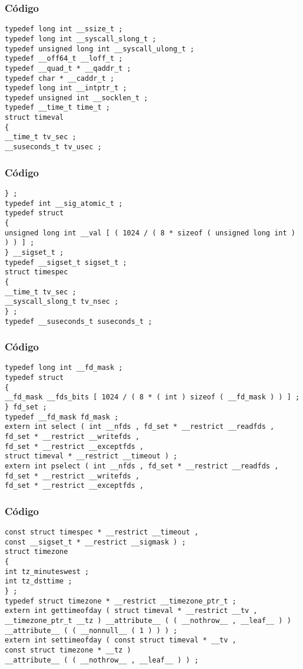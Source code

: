 \documentclass{beamer}
\begin{document}
\begin{frame}[fragile]
\frametitle{C\'odigo}
\begin{verbatim}
typedef long int __ssize_t ; 
typedef long int __syscall_slong_t ; 
typedef unsigned long int __syscall_ulong_t ; 
typedef __off64_t __loff_t ; 
typedef __quad_t * __qaddr_t ; 
typedef char * __caddr_t ; 
typedef long int __intptr_t ; 
typedef unsigned int __socklen_t ; 
typedef __time_t time_t ; 
struct timeval 
{ 
__time_t tv_sec ; 
__suseconds_t tv_usec ; 
\end{verbatim}
\end{frame}
\begin{frame}[fragile]
\frametitle{C\'odigo}
\begin{verbatim}
} ; 
typedef int __sig_atomic_t ; 
typedef struct 
{ 
unsigned long int __val [ ( 1024 / ( 8 * sizeof ( unsigned long int ) ) ) ] ; 
} __sigset_t ; 
typedef __sigset_t sigset_t ; 
struct timespec 
{ 
__time_t tv_sec ; 
__syscall_slong_t tv_nsec ; 
} ; 
typedef __suseconds_t suseconds_t ; 
\end{verbatim}
\end{frame}
\begin{frame}[fragile]
\frametitle{C\'odigo}
\begin{verbatim}
typedef long int __fd_mask ; 
typedef struct 
{ 
__fd_mask __fds_bits [ 1024 / ( 8 * ( int ) sizeof ( __fd_mask ) ) ] ; 
} fd_set ; 
typedef __fd_mask fd_mask ; 
extern int select ( int __nfds , fd_set * __restrict __readfds , 
fd_set * __restrict __writefds , 
fd_set * __restrict __exceptfds , 
struct timeval * __restrict __timeout ) ; 
extern int pselect ( int __nfds , fd_set * __restrict __readfds , 
fd_set * __restrict __writefds , 
fd_set * __restrict __exceptfds , 
\end{verbatim}
\end{frame}
\begin{frame}[fragile]
\frametitle{C\'odigo}
\begin{verbatim}
const struct timespec * __restrict __timeout , 
const __sigset_t * __restrict __sigmask ) ; 
struct timezone 
{ 
int tz_minuteswest ; 
int tz_dsttime ; 
} ; 
typedef struct timezone * __restrict __timezone_ptr_t ; 
extern int gettimeofday ( struct timeval * __restrict __tv , 
__timezone_ptr_t __tz ) __attribute__ ( ( __nothrow__ , __leaf__ ) ) __attribute__ ( ( __nonnull__ ( 1 ) ) ) ; 
extern int settimeofday ( const struct timeval * __tv , 
const struct timezone * __tz ) 
__attribute__ ( ( __nothrow__ , __leaf__ ) ) ; 
\end{verbatim}
\end{frame}
\end{document}
